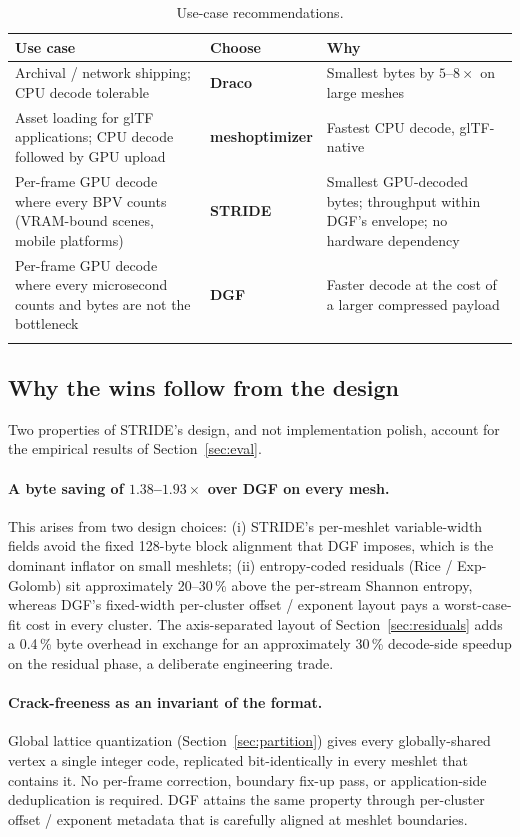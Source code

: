 \documentclass[pdflatex,sn-vancouver-num]{sn-jnl}%
\theoremstyle{thmstyleone}%
\theoremstyle{thmstyletwo}%
\theoremstyle{thmstylethree}%
\begin{document}
\begin{table}[ht]
\caption{Use-case recommendations.}\label{tab:reco}
\begin{tabular}{@{}p{}lp{}@{}}
\toprule
Use case & Choose & Why \\
\midrule
Archival / network shipping; CPU decode tolerable & \textbf{Draco} & Smallest bytes by $5$--$8\times$ on large meshes \\
Asset loading for glTF applications; CPU decode followed by GPU upload & \textbf{meshoptimizer} & Fastest CPU decode, glTF-native \\
Per-frame GPU decode where every BPV counts (VRAM-bound scenes, mobile platforms) & \textbf{STRIDE} & Smallest GPU-decoded bytes; throughput within DGF's envelope; no hardware dependency \\
Per-frame GPU decode where every microsecond counts and bytes are not the bottleneck & \textbf{DGF} & Faster decode at the cost of a larger compressed payload \\
\botrule
\end{tabular}
\end{table}

\subsection{Why the wins follow from the design}

Two properties of STRIDE's design, and not implementation polish, account for the empirical results of Section~\ref{sec:eval}.

\paragraph{A byte saving of $1.38$--$1.93\times$ over DGF on every mesh.}
This arises from two design choices: (i) STRIDE's per-meshlet variable-width fields avoid the fixed 128-byte block alignment that DGF imposes, which is the dominant inflator on small meshlets; (ii) entropy-coded residuals (Rice / Exp-Golomb) sit approximately 20--30\,\% above the per-stream Shannon entropy, whereas DGF's fixed-width per-cluster offset / exponent layout pays a worst-case-fit cost in every cluster. The axis-separated layout of Section~\ref{sec:residuals} adds a 0.4\,\% byte overhead in exchange for an approximately 30\,\% decode-side speedup on the residual phase, a deliberate engineering trade.

\paragraph{Crack-freeness as an invariant of the format.}
Global lattice quantization (Section~\ref{sec:partition}) gives every globally-shared vertex a single integer code, replicated bit-identically in every meshlet that contains it. No per-frame correction, boundary fix-up pass, or application-side deduplication is required. DGF attains the same property through per-cluster offset / exponent metadata that is carefully aligned at meshlet boundaries.
\end{document}
